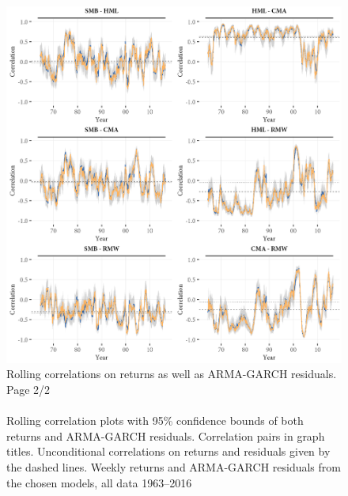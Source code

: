 \begin{figure}[H]
  \centering
  \footnotesize
  \caption{Rolling correlations on returns as well as ARMA-GARCH residuals. Page 2/2 \\ \quad \\
  Rolling correlation plots with 95\% confidence bounds of both returns and ARMA-GARCH residuals. Correlation pairs in graph titles. Unconditional correlations on returns and residuals given by the dashed lines. Weekly returns and ARMA-GARCH residuals from the chosen models, all data 1963--2016}
  \label{fig:appendix_rolling2}
  \includegraphics[scale=1]{graphics/appendix_rolling2.png}  
\end{figure}

\newpage



\newpage



\newpage

